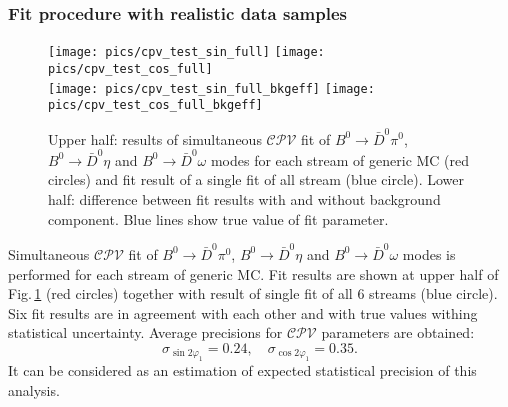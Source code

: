 \documentclass[preprint,aps,showpacs]{revtex4}
\newcommand{\cpvconj}{\ensuremath{\mathcal{CPV}}\xspace}
\newcommand{\sindbeta}{\ensuremath{\sin{2\varphi_1}}\xspace}
\newcommand{\cosdbeta}{\ensuremath{\cos{2\varphi_1}}\xspace}
\newcommand{\bdpi}{\ensuremath{B^0\to \bar D^0\pi^0}\xspace}
\newcommand{\bdeta}{\ensuremath{B^0\to \bar D^0\eta}\xspace}
\newcommand{\bdomega}{\ensuremath{B^0\to \bar D^0\omega}\xspace}
\begin{document}
\subsubsection{Fit procedure with realistic data samples}\label{sec:mc_cpv_streams}
\begin{figure}[htb]
 \texttt{[image: pics/cpv\_test\_sin\_full]}
 \texttt{[image: pics/cpv\_test\_cos\_full]}\\
 \texttt{[image: pics/cpv\_test\_sin\_full\_bkgeff]}
 \texttt{[image: pics/cpv\_test\_cos\_full\_bkgeff]}
 \caption{Upper half: results of simultaneous \cpvconj fit of \bdpi, \bdeta and \bdomega modes for each stream of generic MC (red circles) and fit result of a single fit of all stream (blue circle). Lower half: difference between fit results with and without background component. Blue lines show true value of fit parameter.}
 \label{fig:six_streams}
\end{figure}
Simultaneous \cpvconj fit of \bdpi, \bdeta and \bdomega modes is performed for each stream of generic MC. Fit results are shown at upper half of Fig.\,\ref{fig:six_streams} (red circles) together with result of single fit of all $6$ streams (blue circle). Six fit results are in agreement with each other and with true values withing statistical uncertainty. Average precisions for \cpvconj parameters are obtained:
\begin{equation}\label{eq:cpv_stat_prec}
 \sigma_{\sindbeta} = 0.24,\quad \sigma_{\cosdbeta} = 0.35.
\end{equation}
It can be considered as an estimation of expected statistical precision of this analysis.
\end{document}
